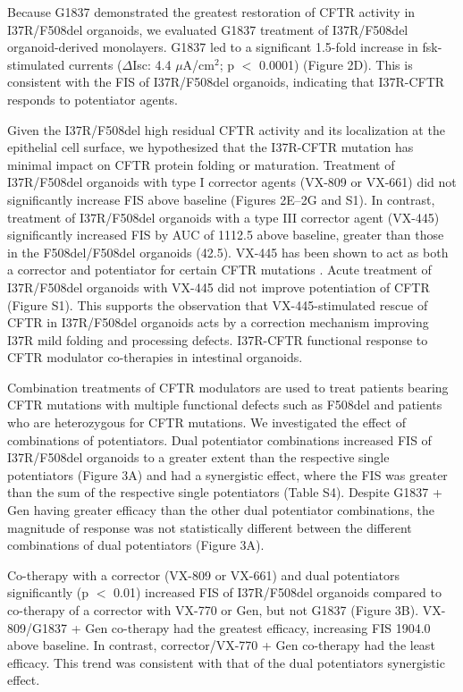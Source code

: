 Because G1837 demonstrated the greatest restoration of CFTR activity in I37R/F508del organoids, we evaluated G1837 treatment of I37R/F508del organoid-derived monolayers. G1837 led to a significant 1.5-fold increase in fsk-stimulated currents ($\Delta$Isc: 4.4 $\mu$A/cm$^2$; p $<$ 0.0001) (Figure 2D). This is consistent with the FIS of I37R/F508del organoids, indicating that I37R-CFTR responds to potentiator agents.

Given the I37R/F508del high residual CFTR activity and its localization at the epithelial cell surface, we hypothesized that the I37R-CFTR mutation has minimal impact on CFTR protein folding or maturation. Treatment of I37R/F508del organoids with type I corrector agents (VX-809 or VX-661) did not significantly increase FIS above baseline (Figures 2E–2G and S1). In contrast, treatment of I37R/F508del organoids with a type III corrector agent (VX-445) significantly increased FIS by AUC of 1112.5 above baseline, greater than those in the F508del/F508del organoids (42.5). VX-445 has been shown to act as both a corrector and potentiator for certain CFTR mutations \cite{laselva2021,shaughnessy2021,veit2021}. Acute treatment of I37R/F508del organoids with VX-445 did not improve potentiation of CFTR (Figure S1). This supports the observation that VX-445-stimulated rescue of CFTR in I37R/F508del organoids acts by a correction mechanism improving I37R mild folding and processing defects. I37R-CFTR functional response to CFTR modulator co-therapies in intestinal organoids.

Combination treatments of CFTR modulators are used to treat patients bearing CFTR mutations with multiple functional defects such as F508del and patients who are heterozygous for CFTR mutations. We investigated the effect of combinations of potentiators. Dual potentiator combinations increased FIS of I37R/F508del organoids to a greater extent than the respective single potentiators (Figure 3A) and had a synergistic effect, where the FIS was greater than the sum of the respective single potentiators (Table S4). Despite G1837 + Gen having greater efficacy than the other dual potentiator combinations, the magnitude of response was not statistically different between the different combinations of dual potentiators (Figure 3A).

Co-therapy with a corrector (VX-809 or VX-661) and dual potentiators significantly (p $<$ 0.01) increased FIS of I37R/F508del organoids compared to co-therapy of a corrector with VX-770 or Gen, but not G1837 (Figure 3B). VX-809/G1837 + Gen co-therapy had the greatest efficacy, increasing FIS 1904.0 above baseline. In contrast, corrector/VX-770 + Gen co-therapy had the least efficacy. This trend was consistent with that of the dual potentiators synergistic effect.

